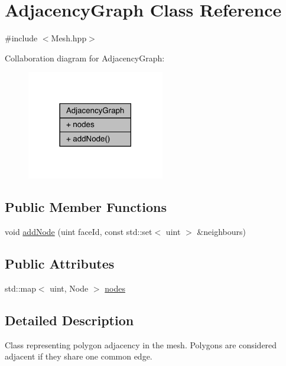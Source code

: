 \hypertarget{class_adjacency_graph}{}\section{Adjacency\+Graph Class Reference}
\label{class_adjacency_graph}


{\ttfamily \#include $<$Mesh.\+hpp$>$}



Collaboration diagram for Adjacency\+Graph\+:\nopagebreak
\begin{figure}[H]
\begin{center}
\leavevmode
\includegraphics[width=170pt]{class_adjacency_graph__coll__graph}
\end{center}
\end{figure}
\subsection*{Public Member Functions}
\begin{DoxyCompactItemize}
\item 
void \hyperlink{class_adjacency_graph_a24a7cc8e5f62cc94872e04cfa10b70dd}{add\+Node} (uint face\+Id, const std\+::set$<$ uint $>$ \&neighbours)
\end{DoxyCompactItemize}
\subsection*{Public Attributes}
\begin{DoxyCompactItemize}
\item 
std\+::map$<$ uint, Node $>$ \hyperlink{class_adjacency_graph_ad3e7a730db698841d4230030898f4291}{nodes}
\end{DoxyCompactItemize}


\subsection{Detailed Description}
Class representing polygon adjacency in the mesh. Polygons are considered adjacent if they share one common edge. 


